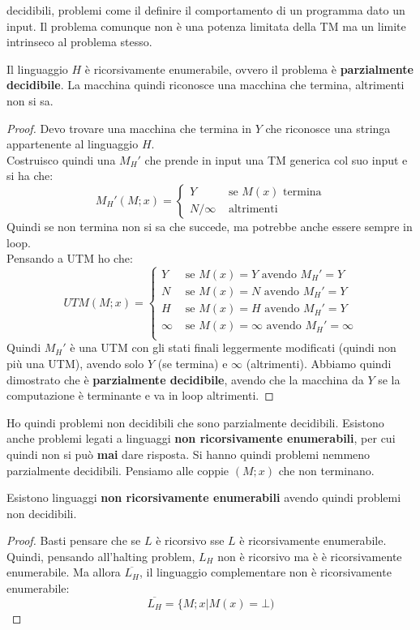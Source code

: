 \documentclass[a4paper,12pt, oneside]{book}
\begin{document}
decidibili, problemi come il definire il comportamento di un programma dato un
input. Il problema comunque non è una potenza limitata della TM ma un limite
intrinseco al problema stesso.
\begin{teorema}
  Il linguaggio $H$ è ricorsivamente enumerabile, ovvero il problema è
  \textbf{parzialmente decidibile}. La macchina quindi riconosce una macchina
  che termina, altrimenti non si sa.  
\end{teorema}
\begin{proof}
  Devo trovare una macchina che termina in $Y$ che riconosce una stringa
  appartenente al linguaggio $H$.\\
  Costruisco quindi una $M_H'$ che prende in input una TM generica col suo
  input e si ha che:
  \[M_H'(M;x)=
   \begin{cases}
     Y &\mbox{ se } M(x)\mbox{ termina}\\
     N/\infty &\mbox{ altrimenti}
    \end{cases}
  \]
  Quindi se non termina non si sa che succede, ma potrebbe anche essere sempre
  in loop.\\
  Pensando a UTM ho che:
  \[UTM(M;x)=
   \begin{cases}
     Y &\mbox{ se } M(x)=Y\mbox{ avendo }M_H'=Y\\
     N &\mbox{ se } M(x)=N\mbox{ avendo }M_H'=Y\\
     H &\mbox{ se } M(x)=H\mbox{ avendo }M_H'=Y\\
     \infty &\mbox{ se } M(x)=\infty\mbox{ avendo }M_H'=\infty\\
    \end{cases}
  \]
  Quindi $M_H'$ è una UTM con gli stati finali leggermente modificati (quindi
  non più una UTM), avendo
  solo $Y$ (se termina) e $\infty$ (altrimenti). Abbiamo quindi dimostrato che è
  \textbf{parzialmente decidibile}, avendo che la macchina da $Y$ se la
  computazione è terminante e va in loop altrimenti.
\end{proof}
Ho quindi problemi non decidibili che sono parzialmente decidibili. Esistono
anche problemi legati a linguaggi \textbf{non ricorsivamente enumerabili}, per
cui quindi non si può \textbf{mai} dare risposta. Si hanno quindi problemi
nemmeno parzialmente decidibili. Pensiamo alle coppie $(M;x)$ che non terminano.
\begin{teorema}
   Esistono linguaggi \textbf{non ricorsivamente enumerabili} avendo quindi
   problemi non decidibili.
\end{teorema}
\begin{proof}
  Basti pensare che se $L$ è ricorsivo sse $L$ è ricorsivamente
  enumerabile. Quindi, pensando all'halting problem, $L_H$ non è ricorsivo ma è
  è ricorsivamente enumerabile. Ma allora $\overline{L_H}$, il linguaggio
  complementare non è ricorsivamente enumerabile: 
  \[\overline{L_H}=\{M;x|M(x)=\bot)\]
\end{proof}
\end{document}
